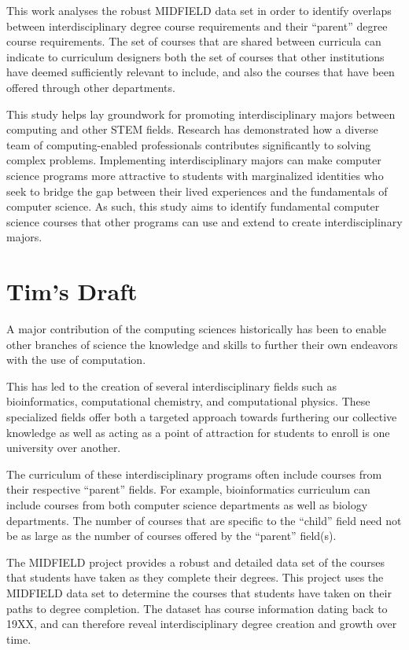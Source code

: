 \documentclass[
  journal,
]{IEEEtran}%
\begin{document}
This work analyses the robust MIDFIELD data set in order to identify
overlaps between interdisciplinary degree course requirements and their
``parent'' degree course requirements. The set of courses that are
shared between curricula can indicate to curriculum designers both the
set of courses that other institutions have deemed sufficiently relevant
to include, and also the courses that have been offered through other
departments.

This study helps lay groundwork for promoting interdisciplinary majors
between computing and other STEM fields. Research has demonstrated how a
diverse team of computing-enabled professionals contributes
significantly to solving complex problems. Implementing
interdisciplinary majors can make computer science programs more
attractive to students with marginalized identities who seek to bridge
the gap between their lived experiences and the fundamentals of computer
science. As such, this study aims to identify fundamental computer
science courses that other programs can use and extend to create
interdisciplinary majors.

\hypertarget{tims-draft}{%
\section{Tim's Draft}\label{tims-draft}}

A major contribution of the computing sciences historically has been to
enable other branches of science the knowledge and skills to further
their own endeavors with the use of computation.

This has led to the creation of several interdisciplinary fields such as
bioinformatics, computational chemistry, and computational physics.
These specialized fields offer both a targeted approach towards
furthering our collective knowledge as well as acting as a point of
attraction for students to enroll is one university over another.

The curriculum of these interdisciplinary programs often include courses
from their respective ``parent'' fields. For example, bioinformatics
curriculum can include courses from both computer science departments as
well as biology departments. The number of courses that are specific to
the ``child'' field need not be as large as the number of courses
offered by the ``parent'' field(s).

The MIDFIELD project provides a robust and detailed data set of the
courses that students have taken as they complete their degrees. This
project uses the MIDFIELD data set to determine the courses that
students have taken on their paths to degree completion. The dataset has
course information dating back to 19XX, and can therefore reveal
interdisciplinary degree creation and growth over time.
\end{document}
